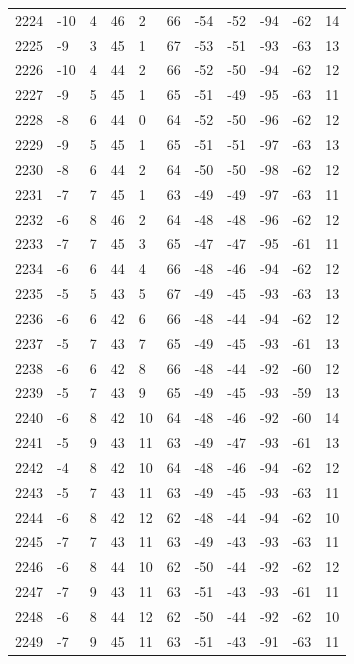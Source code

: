 \begin{table}[H]
\begin{tabular}{lllllllllll}
2224 & -10 & 4 & 46 & 2 & 66 & -54 & -52 & -94 & -62 & 14 \\
2225 & -9 & 3 & 45 & 1 & 67 & -53 & -51 & -93 & -63 & 13 \\
2226 & -10 & 4 & 44 & 2 & 66 & -52 & -50 & -94 & -62 & 12 \\
2227 & -9 & 5 & 45 & 1 & 65 & -51 & -49 & -95 & -63 & 11 \\
2228 & -8 & 6 & 44 & 0 & 64 & -52 & -50 & -96 & -62 & 12 \\
2229 & -9 & 5 & 45 & 1 & 65 & -51 & -51 & -97 & -63 & 13 \\
2230 & -8 & 6 & 44 & 2 & 64 & -50 & -50 & -98 & -62 & 12 \\
2231 & -7 & 7 & 45 & 1 & 63 & -49 & -49 & -97 & -63 & 11 \\
2232 & -6 & 8 & 46 & 2 & 64 & -48 & -48 & -96 & -62 & 12 \\
2233 & -7 & 7 & 45 & 3 & 65 & -47 & -47 & -95 & -61 & 11 \\
2234 & -6 & 6 & 44 & 4 & 66 & -48 & -46 & -94 & -62 & 12 \\
2235 & -5 & 5 & 43 & 5 & 67 & -49 & -45 & -93 & -63 & 13 \\
2236 & -6 & 6 & 42 & 6 & 66 & -48 & -44 & -94 & -62 & 12 \\
2237 & -5 & 7 & 43 & 7 & 65 & -49 & -45 & -93 & -61 & 13 \\
2238 & -6 & 6 & 42 & 8 & 66 & -48 & -44 & -92 & -60 & 12 \\
2239 & -5 & 7 & 43 & 9 & 65 & -49 & -45 & -93 & -59 & 13 \\
2240 & -6 & 8 & 42 & 10 & 64 & -48 & -46 & -92 & -60 & 14 \\
2241 & -5 & 9 & 43 & 11 & 63 & -49 & -47 & -93 & -61 & 13 \\
2242 & -4 & 8 & 42 & 10 & 64 & -48 & -46 & -94 & -62 & 12 \\
2243 & -5 & 7 & 43 & 11 & 63 & -49 & -45 & -93 & -63 & 11 \\
2244 & -6 & 8 & 42 & 12 & 62 & -48 & -44 & -94 & -62 & 10 \\
2245 & -7 & 7 & 43 & 11 & 63 & -49 & -43 & -93 & -63 & 11 \\
2246 & -6 & 8 & 44 & 10 & 62 & -50 & -44 & -92 & -62 & 12 \\
2247 & -7 & 9 & 43 & 11 & 63 & -51 & -43 & -93 & -61 & 11 \\
2248 & -6 & 8 & 44 & 12 & 62 & -50 & -44 & -92 & -62 & 10 \\
2249 & -7 & 9 & 45 & 11 & 63 & -51 & -43 & -91 & -63 & 11 \\

\end{tabular}
\end{table}
